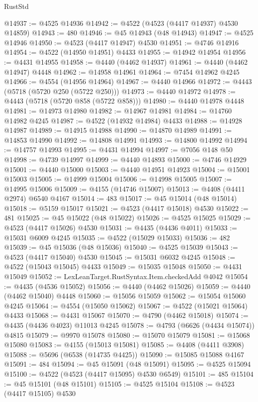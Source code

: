 \begin{lexlean}{RustStd}
\begin{coremodule}
@14937 := @4525 @14936
@14942 := @4522 (@4523 (@4417 @14937) @4530 @14859)
@14943 := 480
@14946 := @45 @14943 (@48 @14943)
@14947 := @4525 @14946
@14950 := @4523 (@4417 @14947) @4530
@14951 := @4746 @14916
@14954 := @4522 (@14950 @14951) @4433
@14955 := @14942 @14954
@14956 := @4431 @14955
@14958 := @4440 (@4462 @14937)
@14961 := @4440 (@4462 @14947) @4448
@14962 := @14958 @14961
@14964 := @7454 @14962 @4245
@14966 := @4554 (@14956 @14964)
@14967 := @4440 @14966
@14972 := @4443 (@5718 (@5720 @250 (@5722 @250)))
@14973 := @4440 @14972
@14978 := @4443 (@5718 (@5720 @858 (@5722 @858)))
@14980 := @4440 @14978 @4448
@14981 := @14973 @14980
@14982 := @14967 @14981
@14984 := @14760 @14982 @4245
@14987 := @4522 (@14932 @14984) @4433
@14988 := @14928 @14987
@14989 := @14915 @14988
@14990 := @14870 @14989
@14991 := @14853 @14990
@14992 := @14808 @14991
@14993 := @14800 @14992
@14994 := @14757 @14993
@14995 := @4431 @14994
@14997 := @7056 @148 @50
@14998 := @4739 @14997
@14999 := @4440 @14893
@15000 := @4746 @14929
@15001 := @4440 @15000
@15003 := @4440 @14951 @14923
@15004 := @15001 @15003
@15005 := @14999 @15004
@15006 := @14998 @15005
@15007 := @14995 @15006
@15009 := @4155 (@14746 @15007)
@15013 := @4408 (@4411 @2974) @6540 @4167
@15014 := 483
@15017 := @45 @15014 (@48 @15014)
@15018 := @5159 @15017
@15021 := @4523 (@4417 @15018) @4530
@15022 := 481
@15025 := @45 @15022 (@48 @15022)
@15026 := @4525 @15025
@15029 := @4523 (@4417 @15026) @4530
@15031 := @4435 (@4436 @4011)
@15033 := @15031 @6009 @4245
@15035 := @4522 (@15029 @15033)
@15036 := 482
@15039 := @45 @15036 (@48 @15036)
@15040 := @4525 @15039
@15043 := @4523 (@4417 @15040) @4530
@15045 := @15031 @6032 @4245
@15048 := @4522 (@15043 @15045) @4433
@15049 := @15035 @15048
@15050 := @4431 @15049
@15052 := LexLeanTarget.RustSyntax.Item.checkedAdd @4042
@15054 := @4435 (@4536 @15052)
@15056 := @4440 (@4462 @15026)
@15059 := @4440 (@4462 @15040) @4448
@15060 := @15056 @15059
@15062 := @15054 @15060 @4245
@15064 := @4554 (@15050 @15062)
@15067 := @4522 (@15021 @15064) @4433
@15068 := @4431 @15067
@15070 := @4790 (@4462 @15018)
@15074 := @4435 (@4436 @4023) @11013 @4245
@15078 := @4793 (@6626 (@4434 @15074)) @4815
@15079 := @9970 @15078
@15080 := @15070 @15079
@15081 := @15068 @15080
@15083 := @4155 (@15013 @15081)
@15085 := @4408 (@4411 @3908)
@15088 := @5696 (@6538 (@14735 @4425))
@15090 := @15085 @15088 @4167
@15091 := 484
@15094 := @45 @15091 (@48 @15091)
@15095 := @4525 @15094
@15100 := @4522 (@4523 (@4417 @15095) @4530 @6549)
@15101 := 485
@15104 := @45 @15101 (@48 @15101)
@15105 := @4525 @15104
@15108 := @4523 (@4417 @15105) @4530

\end{coremodule}
\end{lexlean}
